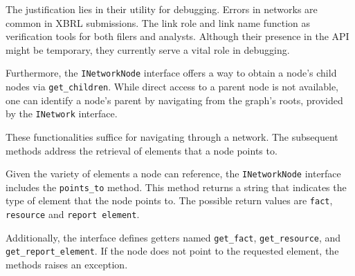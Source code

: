 The justification lies in their utility for debugging.
Errors in networks are common in XBRL submissions.
The link role and link name function as verification tools for both filers and analysts.
Although their presence in the API might be temporary, they currently serve a vital role in debugging.

Furthermore, the \texttt{INetworkNode} interface offers a way to obtain a node's child nodes via \texttt{get\_children}.
While direct access to a parent node is not available, one can identify a node's parent
by navigating from the graph's roots, provided by the \texttt{INetwork} interface.

These functionalities suffice for navigating through a network.
The subsequent methods address the retrieval of elements that a node points to.

Given the variety of elements a node can reference, the \texttt{INetworkNode} interface includes the \texttt{points\_to} method.
This method returns a string that indicates the type of element that the node points to.
The possible return values are \texttt{fact}, \texttt{resource} and \texttt{report element}.

Additionally, the interface defines getters named \texttt{get\_fact}, \texttt{get\_resource}, and \texttt{get\_report\_element}.
If the node does not point to the requested element, the methods raises an exception.


